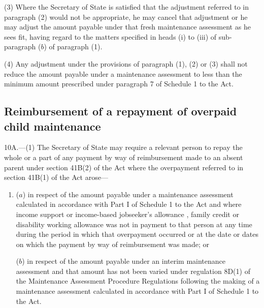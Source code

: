 \documentclass[12pt,a4paper]{article}
\begin{document}
(3) Where 
the Secretary of State  %
is satisfied that the adjustment referred to in paragraph (2) would not be appropriate, he may cancel that adjustment or he may adjust the amount payable under that fresh maintenance assessment as he sees fit, having regard to the matters specified in heads (i) to (iii) of sub-paragraph ($b$) of paragraph (1).

(4) Any adjustment under the provisions of paragraph (1), (2) or (3) shall not reduce the amount payable under a maintenance assessment to less than the minimum amount prescribed under paragraph 7 of Schedule 1 to the Act.



\subsection[10A. Reimbursement of a repayment of overpaid child maintenance]{Reimbursement of a repayment of overpaid child maintenance}

10A.—(1) The Secretary of State may require a relevant person to repay the whole or a part of any payment by way of reimbursement made to an absent parent under section 41B(2) of the Act where the overpayment referred to in section 41B(1) of the Act arose—
\begin{enumerate}\item[]
($a$) in respect of the amount payable under a maintenance assessment calculated in accordance with Part I of Schedule 1 to the Act and where income support
or income-based jobseeker’s allowance%
, family credit or disability working allowance was not in payment to that person at any time during the period in which that overpayment occurred or at the date or dates on which the payment by way of reimbursement was made; or

($b$) in respect of the amount payable under an interim maintenance assessment and that amount has not been varied under regulation 8D(1) of the Maintenance Assessment Procedure Regulations following the making of a maintenance assessment calculated in accordance with Part I of Schedule 1 to the Act.
\end{enumerate}
\end{document}
